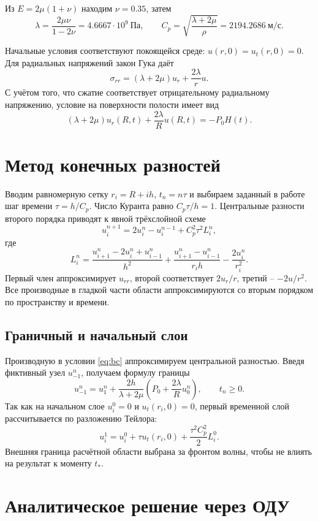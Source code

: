 \documentclass[11pt,a4paper]{article}
\begin{document}
Из $E=2\mu(1+\nu)$ находим $\nu=0.35$, затем
\[
\lambda=\frac{2\mu\nu}{1-2\nu}=4.6667\cdot10^9\ \text{Па},\qquad
C_p=\sqrt{\frac{\lambda+2\mu}{\rho}}=2194.2686\ \text{м/с}.
\]

Начальные условия соответствуют покоящейся среде: $u(r,0)=u_t(r,0)=0$. Для радиальных напряжений закон Гука даёт
\[
\sigma_{rr}=(\lambda+2\mu)u_r+\frac{2\lambda}{r}u.
\]
С учётом того, что сжатие соответствует отрицательному радиальному напряжению, условие на поверхности полости имеет вид
\begin{equation}\label{eq:bc}
(\lambda+2\mu)u_r(R,t)+\frac{2\lambda}{R}u(R,t)=-P_0H(t).
\end{equation}

\section{Метод конечных разностей}

Вводим равномерную сетку $r_i=R+ih$, $t_n=n\tau$ и выбираем заданный в работе шаг времени $\tau=h/C_p$. Число Куранта равно $C_p\tau/h=1$. Центральные разности второго порядка приводят к явной трёхслойной схеме
\begin{equation}\label{eq:scheme}
u_{i}^{n+1}=2u_i^n-u_i^{n-1}+C_p^2\tau^2 L_i^n,
\end{equation}
где
\[
L_i^n=\frac{u_{i+1}^n-2u_i^n+u_{i-1}^n}{h^2}
+\frac{u_{i+1}^n-u_{i-1}^n}{r_i h}-\frac{2u_i^n}{r_i^2}.
\]
Первый член аппроксимирует $u_{rr}$, второй соответствует $2u_r/r$, третий -- $-2u/r^2$. Все производные в гладкой части области аппроксимируются со вторым порядком по пространству и времени.

\subsection{Граничный и начальный слои}
Производную в условии \eqref{eq:bc} аппроксимируем центральной разностью. Введя фиктивный узел $u_{-1}^n$, получаем формулу границы
\begin{equation}\label{eq:ghost}
u_{-1}^n=u_1^n+\frac{2h}{\lambda+2\mu}\left(P_0+\frac{2\lambda}{R}u_0^n\right),\qquad t_n\ge0.
\end{equation}
Так как на начальном слое $u_i^0=0$ и $u_t(r_i,0)=0$, первый временной слой рассчитывается по разложению Тейлора:
\[
u_i^1=u_i^0+\tau u_t(r_i,0)+\frac{\tau^2C_p^2}{2}L_i^0.
\]
Внешняя граница расчётной области выбрана за фронтом волны, чтобы не влиять на результат к моменту $t_*$.

\section{Аналитическое решение через ОДУ}
\end{document}
